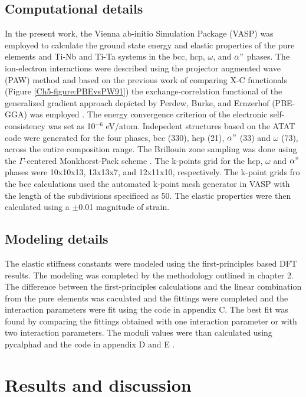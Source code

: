 \subsection{Computational details}

In the present work, the Vienna ab-initio Simulation Package (VASP) \cite{Kresse1996} was employed to calculate the ground state energy and elastic properties of the pure elements and Ti-Nb and Ti-Ta systems in the bcc, hcp, $\omega$, and $\alpha"$ phases. The ion-electron interactions were described using the projector augmented wave (PAW) \cite{Kresse1999,Blochl1994} method and based on the previous work of comparing X-C functionals (Figure \ref{Ch5-figure:PBEvsPW91}) the exchange-correlation functional of the generalized gradient approach depicted by Perdew, Burke, and Ernzerhof (PBE-GGA) was employed \cite{Perdew1996a}. The energy convergence criterion of the electronic self-consistency was set as 10$^{-6}$ eV/atom. Indepedent structures based on the ATAT code were generated for the four phases, bcc (330), hcp (21), $\alpha"$ (33) and $\omega$ (73), across the entire composition range. The Brillouin zone sampling was done using the $\Gamma$-centered Monkhorst-Pack scheme \cite{Monkhorst1976a}. The k-points grid for the hcp, $\omega$ and $\alpha"$ phases were 10x10x13, 13x13x7, and 12x11x10, respectively. The k-point grids fro the bcc calculations used the automated k-point mesh generator in VASP with the length of the subdivisions specificed as 50. The elastic properties were then calculated using a $\pm$0.01 magnitude of strain.

\subsection{Modeling details}

The elastic stiffness constants were modeled using the first-principles based DFT results. The modeling was completed by the methodology outlined in chapter 2. The difference between the first-principles calculations and the linear combination from the pure elements was caculated and the fittings were completed and the interaction parameters were fit using the code in appendix C. The best fit was found by comparing the fittings obtained with one interaction parameter or with two interaction parameters. The moduli values were than calculated using pycalphad and the code in appendix D and E \cite{Otis2017}.

\section{Results and discussion}

